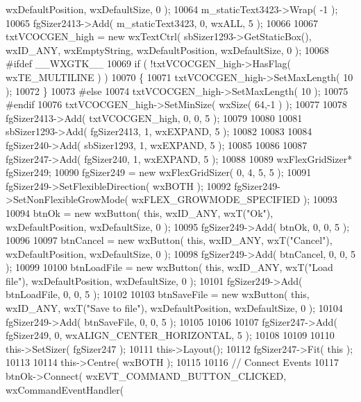 \begin{DoxyCode}
      wxDefaultPosition, wxDefaultSize, 0 );
10064     m_staticText3423->Wrap( -1 );
10065     fgSizer2413->Add( m_staticText3423, 0, wxALL, 5 );
10066     
10067     txtVCOCGEN_high = \textcolor{keyword}{new} wxTextCtrl( sbSizer1293->GetStaticBox(), wxID\_ANY, wxEmptyString, 
      wxDefaultPosition, wxDefaultSize, 0 );
10068 \textcolor{preprocessor}{    #ifdef \_\_WXGTK\_\_}
10069     \textcolor{keywordflow}{if} ( !txtVCOCGEN_high->HasFlag( wxTE\_MULTILINE ) )
10070     \{
10071     txtVCOCGEN_high->SetMaxLength( 10 );
10072     \}
10073 \textcolor{preprocessor}{    #else}
10074     txtVCOCGEN_high->SetMaxLength( 10 );
10075 \textcolor{preprocessor}{    #endif}
10076     txtVCOCGEN_high->SetMinSize( wxSize( 64,-1 ) );
10077     
10078     fgSizer2413->Add( txtVCOCGEN_high, 0, 0, 5 );
10079     
10080     
10081     sbSizer1293->Add( fgSizer2413, 1, wxEXPAND, 5 );
10082     
10083     
10084     fgSizer240->Add( sbSizer1293, 1, wxEXPAND, 5 );
10085     
10086     
10087     fgSizer247->Add( fgSizer240, 1, wxEXPAND, 5 );
10088     
10089     wxFlexGridSizer* fgSizer249;
10090     fgSizer249 = \textcolor{keyword}{new} wxFlexGridSizer( 0, 4, 5, 5 );
10091     fgSizer249->SetFlexibleDirection( wxBOTH );
10092     fgSizer249->SetNonFlexibleGrowMode( wxFLEX\_GROWMODE\_SPECIFIED );
10093     
10094     btnOk = \textcolor{keyword}{new} wxButton( \textcolor{keyword}{this}, wxID\_ANY, wxT(\textcolor{stringliteral}{"Ok"}), wxDefaultPosition, wxDefaultSize, 0 );
10095     fgSizer249->Add( btnOk, 0, 0, 5 );
10096     
10097     btnCancel = \textcolor{keyword}{new} wxButton( \textcolor{keyword}{this}, wxID\_ANY, wxT(\textcolor{stringliteral}{"Cancel"}), wxDefaultPosition, wxDefaultSize, 0 );
10098     fgSizer249->Add( btnCancel, 0, 0, 5 );
10099     
10100     btnLoadFile = \textcolor{keyword}{new} wxButton( \textcolor{keyword}{this}, wxID\_ANY, wxT(\textcolor{stringliteral}{"Load file"}), wxDefaultPosition, wxDefaultSize, 0 );
10101     fgSizer249->Add( btnLoadFile, 0, 0, 5 );
10102     
10103     btnSaveFile = \textcolor{keyword}{new} wxButton( \textcolor{keyword}{this}, wxID\_ANY, wxT(\textcolor{stringliteral}{"Save to file"}), wxDefaultPosition, wxDefaultSize, 0 );
10104     fgSizer249->Add( btnSaveFile, 0, 0, 5 );
10105     
10106     
10107     fgSizer247->Add( fgSizer249, 0, wxALIGN\_CENTER\_HORIZONTAL, 5 );
10108     
10109     
10110     this->SetSizer( fgSizer247 );
10111     this->Layout();
10112     fgSizer247->Fit( \textcolor{keyword}{this} );
10113     
10114     this->Centre( wxBOTH );
10115     
10116     \textcolor{comment}{// Connect Events}
10117     btnOk->Connect( wxEVT\_COMMAND\_BUTTON\_CLICKED, wxCommandEventHandler( 

\end{DoxyCode}
